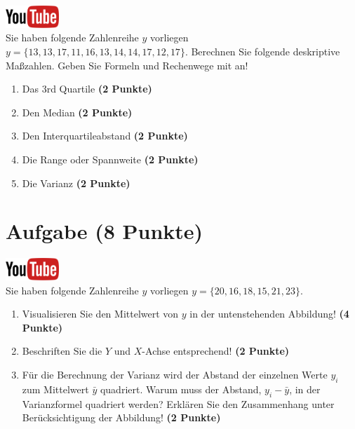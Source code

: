 \documentclass[a4paper, 10pt]{scrartcl}\usepackage[]{graphicx}\usepackage[]{xcolor}
\begin{document}
\hfill\href{https://youtu.be/sBlSc_eJbnw}{\includegraphics[width =
  2cm]{img/youtube}}\\[1Ex]


Sie haben folgende Zahlenreihe $y$ vorliegen
$y = \{13, 13, 17, 11, 16, 13, 14, 14, 17, 12, 17\}$. Berechnen Sie folgende
deskriptive Ma{\ss}zahlen. Geben Sie Formeln und Rechenwege mit an!



\begin{enumerate}
\item Das 3rd Quartile \textbf{(2 Punkte)}
\item Den Median \textbf{(2 Punkte)}
\item Den Interquartileabstand \textbf{(2 Punkte)}
\item Die Range oder Spannweite \textbf{(2 Punkte)}
\item Die Varianz \textbf{(2 Punkte)}
\end{enumerate}
 
\clearpage

\section{Aufgabe \hfill (8 Punkte)}

\hfill\href{https://youtu.be/oMdtYbDInYE}{\includegraphics[width =
  2cm]{img/youtube}}\\[1Ex]

Sie haben folgende Zahlenreihe $y$ vorliegen
$y = \{20, 16, 18, 15, 21, 23\}$.

\begin{enumerate}
\item Visualisieren Sie den Mittelwert von $y$ in der untenstehenden
  Abbildung! \textbf{(4 Punkte)}
\item Beschriften Sie die $Y$ und $X$-Achse entsprechend! \textbf{(2 Punkte)}
\item F{\"u}r die Berechnung der Varianz wird der Abstand der einzelnen Werte $y_i$
  zum Mittelwert $\bar{y}$ quadriert. Warum muss der Abstand, $y_i -
  \bar{y}$, in der Varianzformel quadriert werden?
  Erkl{\"a}ren Sie den Zusammenhang unter Ber{\"u}cksichtigung der Abbildung!
  \textbf{(2 Punkte)}  
\end{enumerate}
\end{document}
